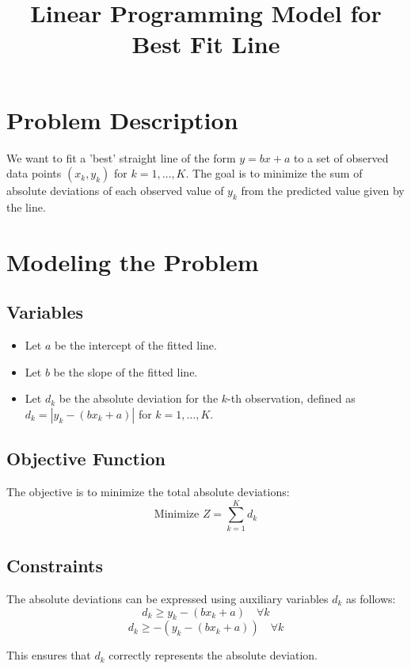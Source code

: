 \documentclass{article}
\begin{document}
\title{Linear Programming Model for Best Fit Line}
\author{}
\date{}
\maketitle

\section*{Problem Description}
We want to fit a 'best' straight line of the form \( y = bx + a \) to a set of observed data points \( (x_k, y_k) \) for \( k = 1, \ldots, K \). The goal is to minimize the sum of absolute deviations of each observed value of \( y_k \) from the predicted value given by the line.

\section*{Modeling the Problem}

\subsection*{Variables}
\begin{itemize}
    \item Let \( a \) be the intercept of the fitted line.
    \item Let \( b \) be the slope of the fitted line.
    \item Let \( d_k \) be the absolute deviation for the \( k \)-th observation, defined as \( d_k = |y_k - (bx_k + a)| \) for \( k = 1, \ldots, K \).
\end{itemize}

\subsection*{Objective Function}
The objective is to minimize the total absolute deviations:
\[
\text{Minimize } Z = \sum_{k=1}^{K} d_k
\]

\subsection*{Constraints}
The absolute deviations can be expressed using auxiliary variables \( d_k \) as follows:
\[
d_k \geq y_k - (bx_k + a) \quad \forall k
\]
\[
d_k \geq -(y_k - (bx_k + a)) \quad \forall k
\]

This ensures that \( d_k \) correctly represents the absolute deviation.
\end{document}
